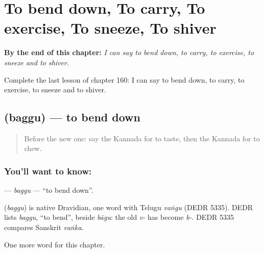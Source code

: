 
\chapter{To bend down, To carry, To exercise, To sneeze, To shiver}
\label{ch:ka-to-bend-down-to-carry-to-exercise-to-sneeze-to-shiver}

\begin{chapteropening}
\textbf{By the end of this chapter:} \emph{I can say to bend down, to carry, to exercise, to sneeze and to shiver.}

Complete the last lesson of chapter 160: I can say to bend down, to carry, to exercise, to sneeze and to shiver.
\end{chapteropening}

\section[\texorpdfstring{\kn{ಬಗ್ಗು} (baggu)}{ಬಗ್ಗು (baggu)}]{ (baggu) — to bend down}

\label{lesson:KA-C160-baggu}



\begin{quote}
Before the new one: say the Kannada for to taste, then the Kannada for to chew.
\end{quote}

\subsection*{You'll want to know: }
\textbf{} — \emph{baggu} — \textquotedblleft{}to bend down\textquotedblright{}.

\begin{cousinweb}
\textbf{} (\emph{baggu}) is native Dravidian, one word with Telugu \emph{vaṅgu} (DEDR 5335). DEDR lists \emph{baggu}, \textquotedblleft{}to bend\textquotedblright{}, beside \emph{bāgu}: the old \emph{v-} has become \emph{b-}. DEDR 5335 compares Sanskrit \emph{vaṅka}.
\end{cousinweb}

\begin{grammarlens}[title={What you've built}]
One more word for this chapter.
\end{grammarlens}

